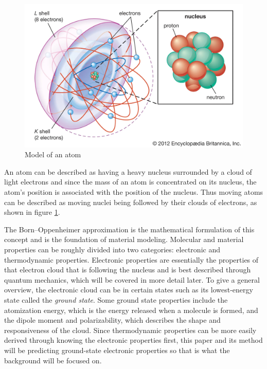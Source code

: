 \documentclass[12pt]{scrartcl}
\begin{document}
\begin{figure}
  \centering
  \includegraphics[scale=.25]{atom.png}
  
  \caption{Model of an atom}\label{fig:atom}
\end{figure}

An atom can be described as having a heavy nucleus surrounded by a cloud of light 
electrons and since the mass of an atom is concentrated on its nucleus, the atom's 
position is associated with the position of the nucleus. Thus moving atoms can be described
as moving nuclei being followed by their clouds of electrons, as shown in figure \ref{fig:atom}. 



The Born–Oppenheimer approximation is the mathematical formulation of this concept and 
is the foundation of material modeling. Molecular and material properties can be 
roughly divided into two categories: electronic and thermodynamic properties. Electronic 
properties are essentially the properties of that electron cloud that is following the 
nucleus and is best described through quantum mechanics, which will be covered in more 
detail later. To give a general overview, the electronic cloud can be in certain states 
such as its lowest-energy state called the \emph{ground state}. Some ground state properties include the atomization energy, which is the energy released when a molecule is formed, and the 
dipole moment and polarizability, which describes the shape and responsiveness of the
cloud. Since thermodynamic properties can be more easily derived through knowing the electronic 
properties first, this paper and its method will be predicting ground-state electronic properties 
so that is what the background will be focused on. 
\end{document}
